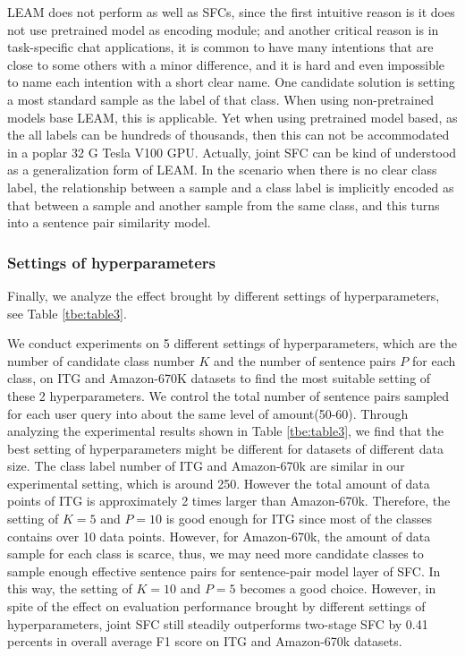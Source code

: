 \documentclass[letterpaper]{article} %
\begin{document}
  LEAM  does not perform as well as SFCs, since the first intuitive reason is it
  does  not use pretrained model as encoding module; and another critical reason
  is  in  task-specific  chat applications, it is common to have many intentions
  that are close to some others with a minor difference, and it is hard and even
  impossible  to  name  each  intention  with  a short clear name. One candidate
  solution  is  setting  a most standard sample as the label of that class. When
  using  non-pretrained  models  base  LEAM,  this is applicable. Yet when using
  pretrained  model  based, as the all labels can be hundreds of thousands, then
  this  can not be accommodated in a poplar 32 G Tesla V100 GPU. Actually, joint
  SFC  can  be  kind  of  understood  as  a  generalization form of LEAM. In the
  scenario when there is no clear class label, the relationship between a sample
  and  a class label is implicitly encoded as that between a sample and another
  sample  from  the  same  class, and this turns into a sentence pair similarity
  model.

  \subsubsection*{Settings  of  hyperparameters} 
  Finally, we analyze the effect brought
  by  different  settings  of  hyperparameters,  see  Table \ref{tbe:table3}. 

  We  conduct  experiments on 5 different settings of hyperparameters, which are
  the  number of candidate class number $K$ and the number of sentence pairs $P$
  for  each  class,  on  ITG  and Amazon-670K datasets to find the most suitable
  setting  of  these  2 hyperparameters. We control the total number of sentence
  pairs  sampled for each user query into about the same level of amount(50-60).
  Through  analyzing the experimental results shown in Table \ref{tbe:table3}, we
  find  that the best setting of hyperparameters might be different for datasets
  of  different  data  size.  The  class label number of ITG and Amazon-670k are
  similar  in  our  experimental setting, which is around 250. However the total
  amount of data points of ITG is approximately 2 times larger than Amazon-670k.
  Therefore,  the  setting of $K=5$ and $P=10$ is good enough for ITG since most
  of  the  classes  contains  over 10 data points. However, for Amazon-670k, the
  amount  of  data  sample  for  each  class  is  scarce, thus, we may need more
  candidate  classes to sample enough effective sentence pairs for sentence-pair
  model  layer  of  SFC.  In this way, the setting of $K=10$ and $P=5$ becomes a
  good choice. However, in spite of the effect on evaluation performance brought
  by different settings of hyperparameters, joint SFC still steadily outperforms
  two-stage  SFC  by  0.41  percents  in  overall  average  F1 score  on  ITG and
  Amazon-670k datasets.
\end{document}

